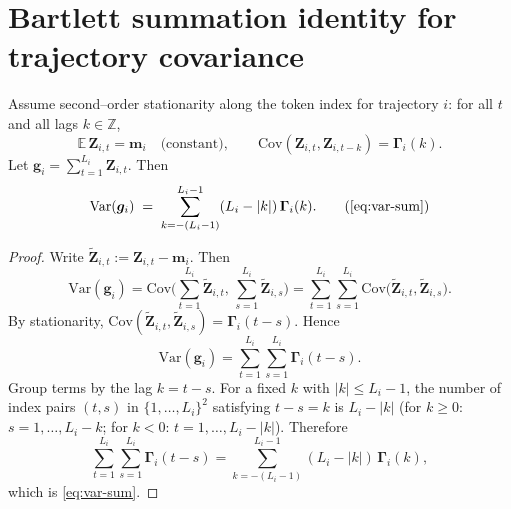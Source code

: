 \section{Bartlett summation identity for trajectory covariance}
\label{app:bartlett}

\begin{lemma}\label{lem:bartlett}
Assume second–order stationarity along the token index for trajectory $i$: for all $t$ and all lags $k\in\mathbb{Z}$,
\[
\mathbb{E}\,\boldsymbol{Z}_{i,t}=\boldsymbol{m}_i\quad\text{(constant)},\qquad 
\mathrm{Cov}(\boldsymbol{Z}_{i,t},\boldsymbol{Z}_{i,t-k})=\boldsymbol{\Gamma}_i(k).
\]
Let $\boldsymbol{g}_i=\sum_{t=1}^{L_i}\boldsymbol{Z}_{i,t}$. Then
\begin{equation}
\mathrm{Var}(\boldsymbol{g}_i)
\;=\;
\sum_{k=-(L_i-1)}^{L_i-1} (L_i-|k|)\,\boldsymbol{\Gamma}_i(k).
\tag{\ref{eq:var-sum}}
\end{equation}
\end{lemma}

\begin{proof}
Write $\widetilde{\boldsymbol{Z}}_{i,t}:=\boldsymbol{Z}_{i,t}-\boldsymbol{m}_i$. Then
\[
\mathrm{Var}(\boldsymbol{g}_i)
=\mathrm{Cov}\!\Big(\sum_{t=1}^{L_i}\widetilde{\boldsymbol{Z}}_{i,t},\,\sum_{s=1}^{L_i}\widetilde{\boldsymbol{Z}}_{i,s}\Big)
=\sum_{t=1}^{L_i}\sum_{s=1}^{L_i}\mathrm{Cov}\!\big(\widetilde{\boldsymbol{Z}}_{i,t},\widetilde{\boldsymbol{Z}}_{i,s}\big).
\]
By stationarity, $\mathrm{Cov}(\widetilde{\boldsymbol{Z}}_{i,t},\widetilde{\boldsymbol{Z}}_{i,s})=\boldsymbol{\Gamma}_i(t-s)$. Hence
\[
\mathrm{Var}(\boldsymbol{g}_i)
=\sum_{t=1}^{L_i}\sum_{s=1}^{L_i}\boldsymbol{\Gamma}_i(t-s).
\]
Group terms by the lag \(k=t-s\). For a fixed \(k\) with \(|k|\le L_i-1\), the number of index pairs \((t,s)\) in \(\{1,\dots,L_i\}^2\) satisfying \(t-s=k\) is \(L_i-|k|\) (for \(k\ge 0\): \(s=1,\dots,L_i-k\); for \(k<0\): \(t=1,\dots,L_i-|k|\)). Therefore
\[
\sum_{t=1}^{L_i}\sum_{s=1}^{L_i}\boldsymbol{\Gamma}_i(t-s)
=\sum_{k=-(L_i-1)}^{L_i-1}(L_i-|k|)\,\boldsymbol{\Gamma}_i(k),
\]
which is \eqref{eq:var-sum}.
\end{proof}


